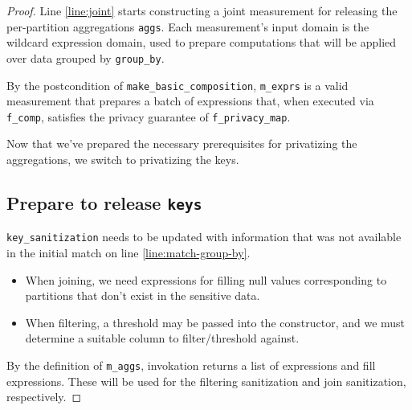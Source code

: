\documentclass{article}
\begin{document}
\begin{proof}
Line \ref{line:joint} starts constructing a joint measurement 
for releasing the per-partition aggregations \texttt{aggs}.
Each measurement's input domain is the wildcard expression domain,
used to prepare computations that will be applied over data grouped by \texttt{group\_by}.

By the postcondition of \texttt{make\_basic\_composition}, 
\texttt{m\_exprs} is a valid measurement that prepares a batch of expressions that, 
when executed via \texttt{f\_comp}, satisfies the privacy guarantee of \texttt{f\_privacy\_map}.

Now that we've prepared the necessary prerequisites for privatizing the aggregations,
we switch to privatizing the keys.

\subsection{Prepare to release \texttt{keys}}
\texttt{key\_sanitization} needs to be updated with information that was not available in the initial match on line \ref{line:match-group-by}.
\begin{itemize}
    \item When joining, we need expressions for filling null values corresponding to partitions that don't exist in the sensitive data.
    \item When filtering, a threshold may be passed into the constructor, and we must determine a suitable column to filter/threshold against.
\end{itemize}

By the definition of \texttt{m\_aggs}, invokation returns a list of expressions and fill expressions.
These will be used for the filtering sanitization and join sanitization, respectively.


\end{proof}
\end{document}
